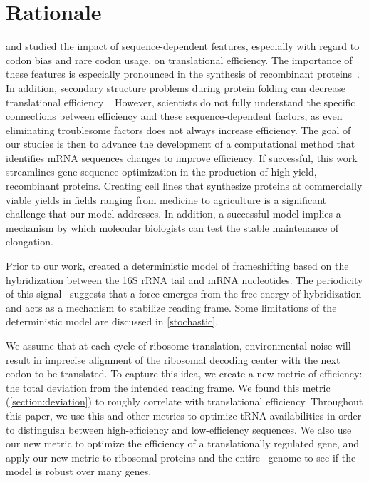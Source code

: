 \documentclass[12pt]{article}
\begin{document}
\section{Rationale}
\citet{kozak05} and \citet{kane95} studied the impact
of sequence-dependent features, especially with regard to codon bias 
and rare codon usage, on translational efficiency.  The importance of 
these features is especially pronounced in the synthesis of recombinant 
proteins~\cite{sorensen05}.  In addition, secondary structure problems 
during protein folding can decrease translational 
efficiency~\cite{kozak05}.  However, scientists do not fully
understand the specific connections between efficiency and these
sequence-dependent factors, as even eliminating troublesome factors
does not always increase efficiency. The goal of our studies is then to
advance the development of a computational method that identifies mRNA
sequences changes to improve efficiency. If
successful, this work streamlines gene sequence optimization in the
production of high-yield, recombinant proteins. Creating cell lines
that synthesize proteins at commercially viable yields in fields ranging from
medicine to agriculture is a significant challenge that our model
addresses. In addition, a successful model implies a mechanism by
which molecular biologists can test the stable maintenance of
elongation.

Prior to our work, \citet{lalit:jbsb} created a deterministic model of
frameshifting based on the hybridization between the 16S rRNA tail and
mRNA nucleotides.  The periodicity of this
signal~\cite{lalit:jbsb} suggests that a force emerges from the free
energy of hybridization and acts as a mechanism to
stabilize reading frame.  Some limitations of the deterministic 
model are discussed in \autoref{stochastic}.

We assume that at each cycle of ribosome translation, environmental
noise will result in imprecise alignment of the ribosomal decoding
center with the next codon to be translated.  To capture this idea, we
create a new metric of efficiency: the total deviation from the
intended reading frame.  We found this metric
(\autoref{section:deviation}) to roughly correlate with translational
efficiency.  Throughout this paper, we use this and other metrics to
optimize tRNA availabilities in order to distinguish between
high-efficiency and low-efficiency sequences. We also use our new
metric to optimize the efficiency of a translationally regulated gene,
and apply our new metric to ribosomal proteins and the entire
\ecoli\ genome to see if the model is robust over many genes.
\end{document}
